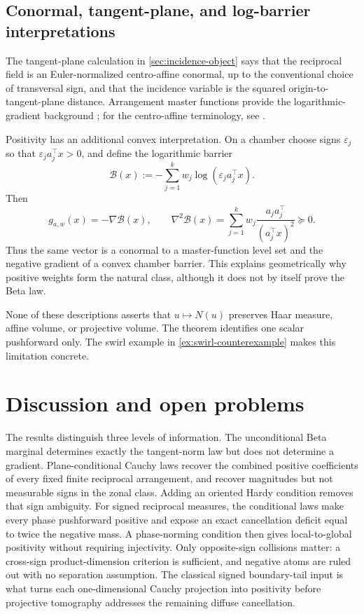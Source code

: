 \documentclass[11pt]{article}
\numberwithin{equation}{section}
\theoremstyle{thmstyleone}%
\theoremstyle{thmstyletwo}%
\let\cref\autoref
\begin{document}
\subsection{Conormal, tangent-plane, and log-barrier interpretations}

The tangent-plane calculation in \cref{sec:incidence-object} says that the
reciprocal field is an Euler-normalized centro-affine conormal, up to the
conventional choice of transversal sign, and that the incidence variable is
the squared origin-to-tangent-plane distance.  Arrangement master functions
provide the logarithmic-gradient background
\cite{cohen-denham-falk-varchenko-2012}; for the centro-affine terminology,
see \cite{nomizu-pinkall-1987}.

Positivity has an additional convex interpretation.  On a chamber choose
signs \(\varepsilon_j\) so that
\(\varepsilon_j a_j^\top x>0\), and define the logarithmic barrier
\[
  \mathcal B(x)
  :=-\sum_{j=1}^k w_j
       \log(\varepsilon_j a_j^\top x).
\]
Then
\[
  g_{a,w}(x)=-\nabla\mathcal B(x),
  \qquad
  \nabla^2\mathcal B(x)
  =\sum_{j=1}^k w_j
    \frac{a_ja_j^\top}{(a_j^\top x)^2}\succeq0.
\]
Thus the same vector is a conormal to a master-function level set and the
negative gradient of a convex chamber barrier.  This explains geometrically
why positive weights form the natural class, although it does not by itself
prove the Beta law.

None of these descriptions asserts that \(u\mapsto N(u)\) preserves Haar
measure, affine volume, or projective volume.  The theorem identifies one
scalar pushforward only.  The swirl example in
\cref{ex:swirl-counterexample} makes this limitation concrete.

\section{Discussion and open problems}
\label{sec:discussion}

The results distinguish three levels of information.  The
unconditional Beta marginal determines exactly the tangent-norm law but
does not determine a gradient.  Plane-conditional Cauchy laws recover the
combined positive coefficients of every fixed finite reciprocal
arrangement, and recover magnitudes but not measurable signs in the zonal
class.  Adding an oriented Hardy condition removes that sign ambiguity.
For signed reciprocal measures, the conditional laws make every phase
pushforward positive and expose an exact cancellation deficit equal to twice
the negative mass.  A phase-norming condition then gives local-to-global
positivity without requiring injectivity.  Only opposite-sign collisions
matter: a cross-sign product-dimension criterion is sufficient, and negative
atoms are ruled out with no separation assumption.  The classical signed
boundary-tail input is what turns each one-dimensional Cauchy projection into
positivity before projective tomography addresses the remaining diffuse
cancellation.
\end{document}
